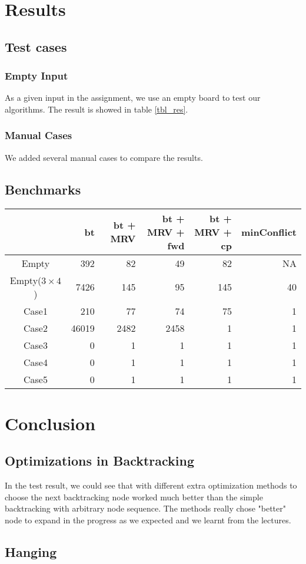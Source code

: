 \documentclass[11pt]{article}
\begin{document}
\section{Results}

\subsection{Test cases}
\subsubsection{Empty Input}
As a given input in the assignment, we use an empty board to test our algorithms. The result is showed in table \ref{tbl_res}.
\subsubsection{Manual Cases}
We added several manual cases to compare the results.

\subsection{Benchmarks}


\begin{tabular}{ | c | r | r | r | r | r |}
\hline
& bt & bt + MRV & bt + MRV + fwd & bt + MRV + cp & minConflict \\ \hline
Empty & 392 & 82 & 49 & 82 & NA \\ \hline
Empty($3 \times 4$) & 7426 & 145 & 95 & 145 & 40 \\ \hline
Case1 & 210 & 77 & 74 & 75 & 1 \\ \hline
Case2 & 46019 & 2482 & 2458 & 1 & 1 \\ \hline
Case3 & 0 & 1 & 1 & 1 & 1 \\ \hline
Case4 & 0 & 1 & 1 & 1 & 1 \\ \hline
Case5 & 0 & 1 & 1 & 1 & 1 \\ \hline
\end{tabular}

\section{Conclusion}
\subsection{Optimizations in Backtracking}
In the test result, we could see that with different extra optimization methods to choose the next backtracking node worked much better than the simple backtracking with arbitrary node sequence. The methods really chose "better" node to expand in the progress as we expected and we learnt from the lectures.

\subsection{Hanging}
\end{document}
